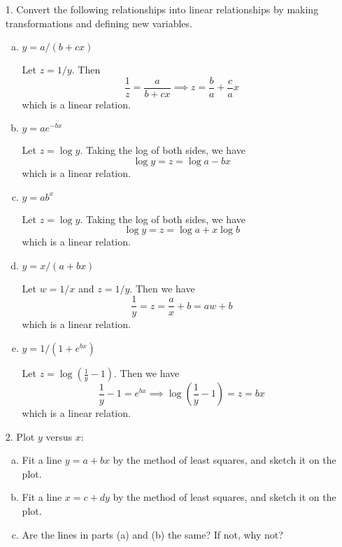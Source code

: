 \documentclass{article}
\begin{document}
\begin{itemize}
	\item[1.] Convert the following relationships into linear relationships by making transformations and defining new variables.
		\begin{enumerate}[a.]
			\item $y=a/(b+cx)$
				\begin{soln}
					Let $z=1/y.$ Then \[\frac{1}{z} = \frac{a}{b+cx} \implies z = \frac{b}{a} + \frac{c}{a}x\] which is a linear relation.
				\end{soln}

			\item $y=ae^{-bx}$
				\begin{soln}
					Let $z=\log y.$ Taking the log of both sides, we have \[\log y = z = \log a - bx\] which is a linear relation.
				\end{soln}

			\item $y=ab^x$
				\begin{soln}
					Let $z=\log y.$ Taking the log of both sides, we have \[\log y = z = \log a+x\log b\] which is a linear relation.
				\end{soln}

			\item $y=x/(a+bx)$
				\begin{soln}
					Let $w=1/x$ and $z=1/y.$ Then we have \[\frac{1}{y} = z = \frac{a}{x} + b = aw + b\] which is a linear relation.
				\end{soln}

			\item $y=1/(1+e^{bx})$
				\begin{soln}
					Let $z=\log\left( \frac{1}{y} - 1 \right).$ Then we have \[\frac{1}{y} - 1 = e^{bx} \implies \log \left( \frac{1}{y} - 1 \right) = z = bx\] which is a linear relation.
				\end{soln}
				
		\end{enumerate}

	\item[2.] Plot $y$ versus $x:$
		\begin{enumerate}[a.]
			\item Fit a line $y=a+bx$ by the method of least squares, and sketch it on the plot.

			\item Fit a line $x=c+dy$ by the method of least squares, and sketch it on the plot.

			\item Are the lines in parts (a) and (b) the same? If not, why not?


\end{enumerate}
\end{itemize}
\end{document}
